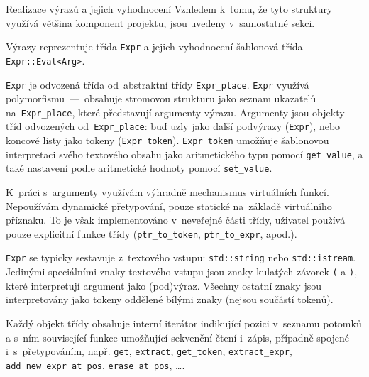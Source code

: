 \documentclass[thesis=M,czech]{FITthesis}[2012/06/26]
\newcommand{\id}[1]{\texttt{#1}}
\begin{document}
\begin{section}{Realizace výrazů a jejich vyhodnocení}
\label{s:impl:exprs}
Vzhledem k~tomu, že tyto struktury využívá většina komponent projektu,
jsou uvedeny v~samostatné sekci.

Výrazy reprezentuje třída \id{Expr}
a jejich vyhodnocení šablonová třída \id{Expr::\-Eval<Arg>}.


\begin{paragraph}{\id{Expr}}\label{p:impl:exprs:expr}
je odvozená třída od~abstraktní třídy \id{Expr\_\-place}.
\id{Expr} využívá polymorfismu~---~obsahuje
stromovou strukturu jako seznam ukazatelů na~\id{Expr\_\-place},
které představují argumenty výrazu.
Argumenty jsou objekty tříd odvozených od~\id{Expr\_\-place}:
buď uzly jako další podvýrazy (\id{Expr}),
nebo koncové listy jako tokeny (\id{Expr\_\-token}).
\id{Expr\_\-token} umožňuje šablonovou
interpretaci svého textového obsahu
jako aritmetického typu pomocí \id{get\_\-value},
a také nastavení podle aritmetické hodnoty pomocí \id{set\_\-value}.

K~práci s~argumenty využívám výhradně
mechanismus virtuálních funkcí.
Nepoužívám dynamické přetypování,
pouze statické na~základě virtuálního příznaku.
To je však implementováno v~neveřejné části třídy,
uživatel používá pouze explicitní funkce třídy
(\id{ptr\_\-to\_\-token}, \id{ptr\_\-to\_\-expr}, apod.).

\id{Expr} se typicky sestavuje z~textového vstupu:
\id{std::\-string} nebo \id{std::\-istream}.
Jedinými speciálními znaky textového vstupu
jsou znaky kulatých závorek \id{(} a \id{)},
které interpretují argument jako (pod)výraz.
Všechny ostatní znaky jsou interpretovány jako tokeny
oddělené bílými znaky (nejsou součástí tokenů).

Každý objekt třídy obsahuje interní iterátor
indikující pozici v~seznamu potomků
a s~ním související funkce
umožňující sekvenční čtení i~zápis,
případně spojené i~s~přetypováním,
např. \id{get}, \id{extract},
\id{get\_\-token}, \id{extract\_\-expr},
\id{add\_\-new\_\-expr\_\-at\_\-pos},
\id{erase\_\-at\_\-pos}, \dots.


\end{paragraph}
\end{section}
\end{document}
